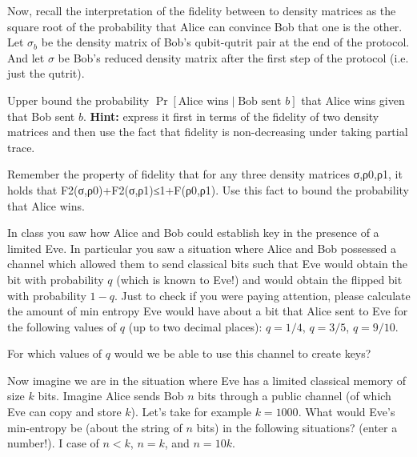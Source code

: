 \documentclass[a4paper,10pt,landscape,twocolumn]{scrartcl}
\begin{document}
\begin{exercise}
\begin{subex}
Now, recall the interpretation of the fidelity between to density matrices as the square root of the probability that Alice can convince Bob that one is the other. Let $\sigma_b$ be the density matrix of Bob's qubit-qutrit pair at the end of the protocol. And let $\sigma$ be Bob's reduced density matrix after the first step of the protocol (i.e. just the qutrit).

Upper bound the probability $\Pr[\text{Alice wins} \mid \text{Bob sent $b$}]$ that Alice wins given that Bob sent $b$.
\textbf{Hint: }express it first in terms of the fidelity of two density matrices and then use the fact that fidelity is non-decreasing under taking partial trace.
\end{subex}

\begin{subex}
Remember the property of fidelity that for any three density matrices σ,ρ0,ρ1, it holds that F2(σ,ρ0)+F2(σ,ρ1)≤1+F(ρ0,ρ1). 
Use this fact to bound the probability that Alice wins.
\end{subex}

\end{exercise}

\begin{exercise}
\begin{subex}[Problem 2.1]
In class you saw how Alice and Bob could establish key in the presence of a limited Eve. In particular you saw a situation where Alice and Bob possessed a channel which allowed them to send classical bits such that Eve would obtain the bit with probability $q$ (which is known to Eve!) and would obtain the flipped bit with probability $1-q$. Just to check if you were paying attention, please calculate the amount of min entropy Eve would have about a bit that Alice sent to Eve for the following values of $q$ (up to two decimal places): $q=1/4$, $q=3/5$, $q=9/10$.
\end{subex}

\begin{subex}[Problem 2.2]
For which values of $q$ would we be able to use this channel to create keys?
\end{subex}

\begin{subex}[Problem 2.3]
Now imagine we are in the situation where Eve has a limited classical memory of size $k$ bits. Imagine Alice sends Bob $n$ bits through a public channel (of which Eve can copy and store $k$). Let's take for example $k=1000$. What would Eve's min-entropy be (about the string of $n$ bits) in the following situations? (enter a number!). I case of $n<k$, $n=k$, and $n=10k$.
\end{subex}
\end{exercise}
\end{document}
